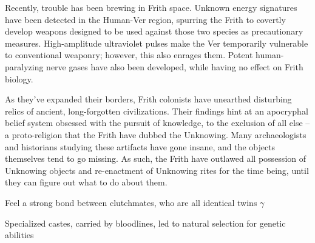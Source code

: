 \documentclass[blue]{guildcamp4}
\begin{document}
Recently, trouble has been brewing in Frith space. Unknown energy signatures have been detected in the Human-Ver region, spurring the Frith to covertly develop weapons designed to be used against those two species as precautionary measures. High-amplitude ultraviolet pulses make the Ver temporarily vulnerable to conventional weaponry; however, this also enrages them. Potent human-paralyzing nerve gases have also been developed, while having no effect on Frith biology.

As they've expanded their borders, Frith colonists have unearthed disturbing relics of ancient, long-forgotten civilizations. Their findings hint at an apocryphal belief system obsessed with the pursuit of knowledge, to the exclusion of all else -- a proto-religion that the Frith have dubbed the Unknowing. Many archaeologists and historians studying these artifacts have gone insane, and the objects themselves tend to go missing. As such, the Frith have outlawed all possession of Unknowing objects and re-enactment of Unknowing rites for the time being, until they can figure out what to do about them.
	
\begin{itemz}[To add]
\item Feel a strong bond between clutchmates, who are all identical twins $\gamma$
\item Specialized castes, carried by bloodlines, led to natural selection for genetic abilities 

\end{itemz}
	
\end{document}
